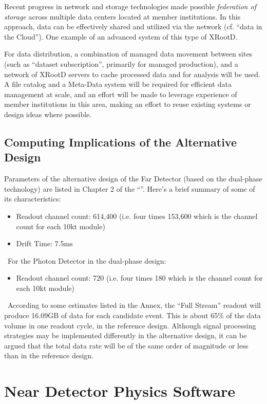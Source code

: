 Recent progress in network and storage technologies made possible
\textit{federation of storage} across multiple data centers located at
member institutions. In this approach, data can be effectively shared
and utilized via the network (cf. ``data in the Cloud''). One example
of an advanced system of this type of XRootD.

For data distribution, a combination of managed data movement between
sites (such as ``dataset subscription'', primarily for managed
production), and a network of XRootD servers to cache processed data
and for analysis will be used.  A file catalog and a Meta-Data system
will be required for efficient data management at scale, and an effort
will be made to leverage experience of member institutions in this
area, making an effort to reuse existing systems or design ideas where
possible.

\subsection{Computing Implications of the Alternative Design}
\label{sec:detectors-sc-alternate}
Parameters of the alternative design of the Far Detector (based on the
dual-phase technology) are listed in Chapter 2 of the
``\anxrates''. Here's a brief summary of some of its characteristics:

\begin{itemize}
	\item Readout channel count: 614,400 (i.e. four times 153,600 which is the channel count
	for each 10kt module)
	\item Drift Time: 7.5ms
\end{itemize}
\
For the Photon Detector in the dual-phase design:
\begin{itemize}
	\item Readout channel count: 720 (i.e. four times 180 which is the channel count
	for each 10kt module)
\end{itemize}
\ According to some estimates listed in the Annex, the ``Full Stream''
readout will produce 16.09GB of data for each candidate event. This is
about 65\% of the data volume in one readout cycle, in the reference
design.  Although signal processing strategies may be implemented
differently in the alternative design, it can be argued that the total
data rate will be of the same order of magnitude or less than in the
reference design.

\section{Near Detector Physics Software}
\label{sec:detectors-sc-nd-physics-software}

